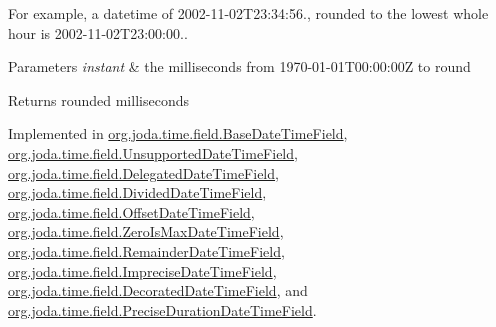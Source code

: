 For example, a datetime of 2002-\/11-\/02\-T23\-:34\-:56., rounded to the lowest whole hour is 2002-\/11-\/02\-T23\-:00\-:00..


\begin{DoxyParams}{Parameters}
{\em instant} & the milliseconds from 1970-\/01-\/01\-T00\-:00\-:00\-Z to round \\
\hline
\end{DoxyParams}
\begin{DoxyReturn}{Returns}
rounded milliseconds 
\end{DoxyReturn}


Implemented in \hyperlink{classorg_1_1joda_1_1time_1_1field_1_1_base_date_time_field_a4708ea912777d8dc5e9c6a8eaef33473}{org.\-joda.\-time.\-field.\-Base\-Date\-Time\-Field}, \hyperlink{classorg_1_1joda_1_1time_1_1field_1_1_unsupported_date_time_field_aa1eb8c52f4f054abdeba2a2870fdcb45}{org.\-joda.\-time.\-field.\-Unsupported\-Date\-Time\-Field}, \hyperlink{classorg_1_1joda_1_1time_1_1field_1_1_delegated_date_time_field_a8f5f4ba3cf2a25d6ee8b76d3cb8adec6}{org.\-joda.\-time.\-field.\-Delegated\-Date\-Time\-Field}, \hyperlink{classorg_1_1joda_1_1time_1_1field_1_1_divided_date_time_field_aa6797087fc15f87da79e732a664699e6}{org.\-joda.\-time.\-field.\-Divided\-Date\-Time\-Field}, \hyperlink{classorg_1_1joda_1_1time_1_1field_1_1_offset_date_time_field_af7e8fc6783ae94a1e11b9582a38160c9}{org.\-joda.\-time.\-field.\-Offset\-Date\-Time\-Field}, \hyperlink{classorg_1_1joda_1_1time_1_1field_1_1_zero_is_max_date_time_field_a036742db40169291705fe496604c5978}{org.\-joda.\-time.\-field.\-Zero\-Is\-Max\-Date\-Time\-Field}, \hyperlink{classorg_1_1joda_1_1time_1_1field_1_1_remainder_date_time_field_abb13f870c07e593a156e45f6797f8c61}{org.\-joda.\-time.\-field.\-Remainder\-Date\-Time\-Field}, \hyperlink{classorg_1_1joda_1_1time_1_1field_1_1_imprecise_date_time_field_a003f001fe5680f4a5f4cb2c61d4ad6d7}{org.\-joda.\-time.\-field.\-Imprecise\-Date\-Time\-Field}, \hyperlink{classorg_1_1joda_1_1time_1_1field_1_1_decorated_date_time_field_a900b454e29332973f15ce88e34774878}{org.\-joda.\-time.\-field.\-Decorated\-Date\-Time\-Field}, and \hyperlink{classorg_1_1joda_1_1time_1_1field_1_1_precise_duration_date_time_field_ad751284833564660913d259c7cfd3e48}{org.\-joda.\-time.\-field.\-Precise\-Duration\-Date\-Time\-Field}.

